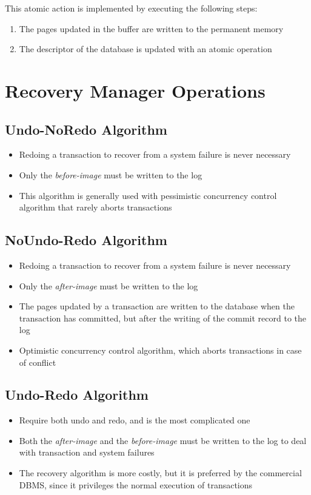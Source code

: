 This atomic action is implemented by executing the following steps:
\begin{enumerate}
    \item The pages updated in the buffer are written to the permanent memory
    \item The descriptor of the database is updated with an atomic operation
\end{enumerate}

\section{Recovery Manager Operations}
\subsection{Undo-NoRedo Algorithm}
\begin{itemize}
    \item Redoing a transaction to recover from a system failure is never necessary
    \item Only the \textit{before-image} must be written to the log
    \item This algorithm is generally used with pessimistic concurrency control algorithm that rarely aborts transactions
\end{itemize}

\subsection{NoUndo-Redo Algorithm}
\begin{itemize}
    \item Redoing a transaction to recover from a system failure is never necessary
    \item Only the \textit{after-image} must be written to the log
    \item The pages updated by a transaction are written to the database when the transaction has committed, but after the writing of the commit record to the log
    \item Optimistic concurrency control algorithm, which aborts transactions in case of conflict
\end{itemize}

\subsection{Undo-Redo Algorithm}
\begin{itemize}
    \item Require both undo and redo, and is the most complicated one
    \item Both the \textit{after-image} and the \textit{before-image} must be written to the log to deal with transaction and system failures
    \item The recovery algorithm is more costly, but it is preferred by the commercial DBMS, since it privileges the normal execution of transactions
\end{itemize}


